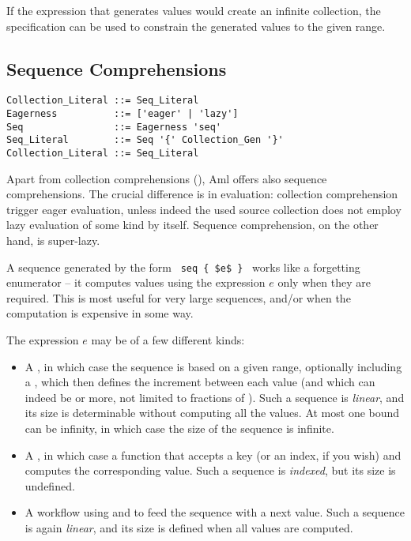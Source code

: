 If the expression that generates values would create an infinite collection, the  specification can be used to constrain the generated values to the given range. 






\subsection{Sequence Comprehensions}
\label{sec:sequence-comprehensions}

\syntax\begin{lstlisting}
Collection_Literal ::= Seq_Literal
Eagerness          ::= ['eager' | 'lazy']
Seq                ::= Eagerness 'seq'
Seq_Literal        ::= Seq '{' Collection_Gen '}'
Collection_Literal ::= Seq_Literal
\end{lstlisting}

Apart from collection comprehensions (), Aml offers also sequence comprehensions. The crucial difference is in evaluation: collection comprehension trigger eager evaluation, unless indeed the used source collection does not employ lazy evaluation of some kind by itself. Sequence comprehension, on the other hand, is super-lazy. 

A sequence generated by the form ~\lstinline!seq { $e$ }!~ works like a forgetting enumerator -- it computes values using the expression $e$ only when they are required. This is most useful for very large sequences, and/or when the computation is expensive in some way. 

The expression $e$ may be of a few different kinds:
\begin{itemize}
  \item A , in which case the sequence is based on a given range, optionally including a , which then defines the increment between each value (and which can indeed be  or more, not limited to fractions of ). Such a sequence is {\em linear}, and its size is determinable without computing all the values. At most one bound can be infinity, in which case the size of the sequence is infinite. 
  \item A , in which case a function that accepts a key (or an index, if you wish) and computes the corresponding value. Such a sequence is {\em indexed}, but its size is undefined. 
  \item A workflow using  and  to feed the sequence with a next value. Such a sequence is again {\em linear}, and its size is defined when all values are computed. 
\end{itemize}

